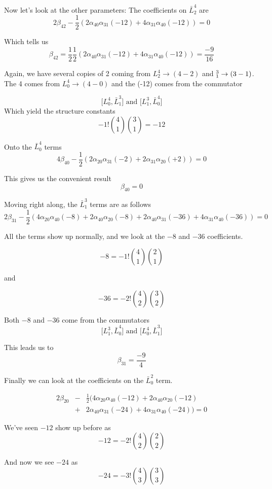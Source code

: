 \documentclass{article}
\newcommand{\lrbrack}[2]{\lbrack #1 , #2 \rbrack}
\newcommand{\half}{\frac{1}{2}}
\begin{document}
Now let's look at the other parameters:
The coefficients on $\bar{L}_2^4$ are
\[
2 \beta_{42} - \half(2\alpha_{40}\alpha_{31}(-12)+4\alpha_{31}\alpha_{40}(-12)) = 0
\]

Which tells us 
\[
\beta_{42} = \half\half(2\alpha_{40}\alpha_{31}(-12)+4\alpha_{31}\alpha_{40}(-12))=  \frac{-9}{16}
\]

Again, we have several copies of 2 coming from $L_2^4 \rightarrow (4-2)$ and $\LARGE_1^3 \rightarrow (3-1)$.  The 4 comes from $L_0^4 \rightarrow (4-0)$ and the (-12) comes from the commutator

\[
\lrbrack{L_0^4}{\bar{L}_1^3} \textrm{ and } \lrbrack{L_1^3}{\bar{L}_0^4}
\]
Which yield the structure constants 
\[
-1! {4\choose 1}{3 \choose 1} = -12
\]

Onto the $\bar{L}_0^4$ terms
\[
4\beta_{40} - \half(2\alpha_{20}\alpha_{31}(-2) + 2\alpha_{31}\alpha_{20}(+2)) = 0
\]

This gives us the convenient result
\[
\beta_{40} = 0
\]

Moving right along, the $\bar{L}_1^3$ terms are as follows
\[
2\beta_{31} - \half(4\alpha_{20}\alpha_{40}(-8)+ 2\alpha_{40}\alpha_{20}(-8) + 2 \alpha_{40}\alpha_{31}(-36)+4\alpha_{31}\alpha_{40}(-36))=0
\]


All the terms show up normally, and we look at the $-8$ and $-36$ coefficients.

\[
-8 = -1!{4\choose 1}{2\choose 1}
\]

and 

\[
-36 = -2!{4\choose 2}{3\choose 2}
\]

Both $-8$ and $-36$ come from the commutators
\[
\lrbrack{L_1^3}{\bar{L}_0^4} \textrm{ and  } \lrbrack{L_0^4}{\bar{L}_1^3}
\]


This leads us to
\[
\beta_{31} = \frac{-9}{4}
\]



Finally we can look at the coefficients on the $\bar{L}_0^2$ term.

\begin{eqnarray*}
2\beta_{20} &-& \half(4\alpha_{20}\alpha_{40}(-12) + 2\alpha_{40}\alpha_{20}(-12)\\
            &+& 2\alpha_{40}\alpha_{31}(-24) +4\alpha_{31}\alpha_{40}(-24) ) =0 
\end{eqnarray*}

We've seen $-12$ show up before as 
\[
-12 = -2!{4\choose 2}{2\choose 2}
\]

And now we see $-24$ as
\[
-24 = -3! {4 \choose 3}{3 \choose 3}
\]
\end{document}
